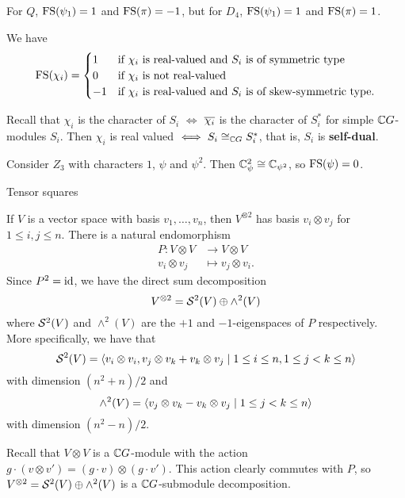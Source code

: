 \begin{exam}
  For $Q$, $\operatorname{FS}(\psi_1)=1$ and $\operatorname{FS}(\pi)=-1$, but for $D_4$, $\operatorname{FS}(\psi_1)=1$ and $\operatorname{FS}(\pi)=1$.
\end{exam}

\begin{thm}\label{16:frob-schur}
  We have
  \begin{equation*}
    \operatorname{FS}(\chi_i)=
    \begin{cases}
      1 &\text{if $\chi_i$ is real-valued and $S_i$ is of symmetric type} \\
      0 &\text{if $\chi_i$ is not real-valued} \\
      -1 &\text{if $\chi_i$ is real-valued and $S_i$ is of skew-symmetric type.}
    \end{cases}
  \end{equation*}
\end{thm}

\begin{rmk}
  Recall that $\chi_i$ is the character of $S_i$ $\iff$ $\overline{\chi_i}$ is the character of $S_i^*$ for simple $\mathbb{C} G$-modules $S_i$.
  Then $\chi_i$ is real valued $\iff S_i \cong_{\mathbb{C} G} S_i^*$, that is, $S_i$ is \textbf{self-dual}.
\end{rmk}

\begin{exam}
  Consider $Z_3$ with characters $1$, $\psi$ and $\psi^2$.
  Then $\mathbb{C}_\psi^2 \cong \mathbb{C}_{\psi^2}$, so $\operatorname{FS}(\psi)=0$.
\end{exam}

Tensor squares

If $V$ is a vector space with basis $v_1,\ldots,v_n$, then $V^{\otimes 2}$ has basis $v_i \otimes v_j$ for $1 \leq i,j \leq n$.
There is a natural endomorphism
\begin{align*}
  P: V \otimes V &\to V \otimes V \\
  v_i \otimes v_j &\mapsto v_j \otimes v_i.
\end{align*}
Since $P^2=\operatorname{id}$, we have the direct sum decomposition
\[ V^{\otimes 2} = \mathcal{S}^2 (V) \oplus \wedge^2 (V) \]
where $\mathcal{S}^2(V)$ and $\wedge^2(V)$ are the $+1$ and $-1$-eigenspaces of $P$ respectively.
More specifically, we have that
\[ \mathcal{S}^2(V) = {\left\langle v_i \otimes v_i, v_j \otimes v_k + v_k \otimes v_j \mid 1 \leq i \leq n, 1 \leq j<k \leq n  \right\rangle} \]
with dimension $(n^2+n)/2$ and
\[ \mathcal{\wedge}^2(V) = {\left\langle v_j \otimes v_k - v_k \otimes v_j \mid 1 \leq j<k \leq n  \right\rangle} \]
with dimension $(n^2-n)/2$.

Recall that $V \otimes V$ is a $\mathbb{C} G$-module with the action $g \cdot (v \otimes v') = (g \cdot v) \otimes (g \cdot v')$.
This action clearly commutes with $P$, so $V^{\otimes 2} = \mathcal{S}^2(V) \oplus \wedge^2(V)$ is a $\mathbb{C} G$-submodule decomposition.

